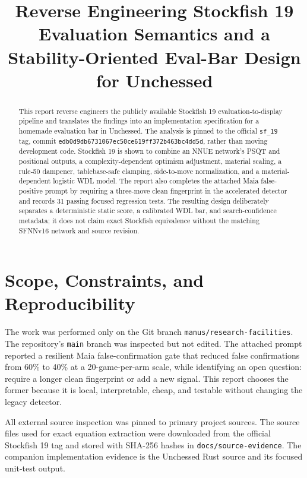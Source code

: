 \documentclass[10pt,conference]{IEEEtran}
\title{Reverse Engineering Stockfish 19 Evaluation Semantics and a Stability-Oriented Eval-Bar Design for Unchessed}
\author{\IEEEauthorblockN{Manus AI}\IEEEauthorblockA{Unchessed UCI Engine Research\ September 2026}}
\begin{document}
\maketitle

\begin{abstract}
This report reverse engineers the publicly available Stockfish 19 evaluation-to-display pipeline and translates the findings into an implementation specification for a homemade evaluation bar in Unchessed. The analysis is pinned to the official \texttt{sf\_19} tag, commit \texttt{edb0d9db6731067ec50ce619ff372b463bc4dd5d}, rather than moving development code. Stockfish 19 is shown to combine an NNUE network's PSQT and positional outputs, a complexity-dependent optimism adjustment, material scaling, a rule-50 dampener, tablebase-safe clamping, side-to-move normalization, and a material-dependent logistic WDL model. The report also completes the attached Maia false-positive prompt by requiring a three-move clean fingerprint in the accelerated detector and records 31 passing focused regression tests. The resulting design deliberately separates a deterministic static score, a calibrated WDL bar, and search-confidence metadata; it does not claim exact Stockfish equivalence without the matching SFNNv16 network and source revision.
\end{abstract}

\section{Scope, Constraints, and Reproducibility}
The work was performed only on the Git branch \texttt{manus/research-facilities}. The repository's \texttt{main} branch was inspected but not edited. The attached prompt reported a resilient Maia false-confirmation gate that reduced false confirmations from 60\% to 40\% at a 20-game-per-arm scale, while identifying an open question: require a longer clean fingerprint or add a new signal. This report chooses the former because it is local, interpretable, cheap, and testable without changing the legacy detector.

All external source inspection was pinned to primary project sources. The source files used for exact equation extraction were downloaded from the official Stockfish 19 tag and stored with SHA-256 hashes in \texttt{docs/source-evidence}. The companion implementation evidence is the Unchessed Rust source and its focused unit-test output.
\end{document}
